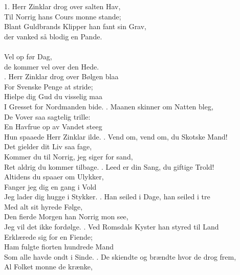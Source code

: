 \begin{flushleft}
1. Herr Zinklar drog over salten Hav, \\
Til Norrig hans Cours monne stande;\\
Blant Guldbrands Klipper han fant sin Grav,\\
der vanked så blodig en Pande.\\
\hops
\hspace{0.9cm}\\ 
\hspace{0.9cm}Vel op før Dag, \tab{}\\
\hspace{0.9cm}de kommer vel over den Hede.\\
. Herr Zinklar drog over Bølgen blaa  \\
For Svenske Penge at stride; \tab{}\\
Hielpe dig Gud du visselig maa \\
I Gresset for Nordmanden bide. 
. Maanen skinner om Natten bleg,\\
De Vover saa sagtelig trille:\\
En Havfrue op av Vandet steeg\\
Hun spaaede Herr Zinklar ilde.
. Vend om, vend om, du Skotske Mand!\\
Det gielder dit Liv saa fage,\\
Kommer du til Norrig, jeg siger for sand,\\
Ret aldrig du kommer tilbage.
. Leed er din Sang, du giftige Trold!\\
Altidens du spaaer om Ulykker,\\
Fanger jeg dig en gang i Vold\\
Jeg lader dig hugge i Stykker.
. Han seiled i Dage, han seiled i tre\\
Med alt sit hyrede Følge,\\
Den fierde Morgen han Norrig mon see,\\
Jeg vil det ikke fordølge.
. Ved Romsdals Kyster han styred til Land\\
Erklærede sig for en Fiende;\\
Ham fulgte fiorten hundrede Mand\\
Som alle havde ondt i Sinde.
. De skiendte og brændte hvor de drog frem,\\
Al Folket monne de krænke,\\

\end{flushleft}
